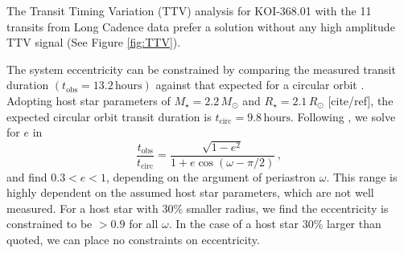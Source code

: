 \documentclass[preprint]{emulateapj}
\begin{document}
The Transit Timing Variation (TTV) analysis for KOI-368.01 with the 
11 transits from Long Cadence data prefer a solution without any high 
amplitude TTV signal (See Figure \ref{fig:TTV}).

The system eccentricity can be constrained by comparing the measured
transit duration $(t_\text{obs}=13.2\,\text{hours})$ against that expected for a circular
orbit \citep[e.g.][]{Barnes2007,Burke2008,Kane2012}. Adopting host star
parameters of $M_\star = 2.2\,M_\odot$ and $R_\star = 2.1\,R_\odot$
[cite/ref], the expected circular orbit transit duration is
$t_\text{circ} =9.8\,\text{hours}$. Following \citet{Burke2008}, we
solve for $e$ in
\begin{equation}
  \label{eq:ecc}
  \frac{t_\text{obs}}{t_\text{circ}} = \frac{\sqrt{1-e^2}}{1+e \cos(\omega-\pi/2)}\,,
\end{equation}
and find $0.3 < e < 1$, depending on the argument of periastron $\omega$. This range is highly
dependent on the assumed host star parameters, which are not well
measured. For a host star with 30\% smaller radius, we find the
eccentricity is constrained to be $>0.9$ for all $\omega$. In the case
of a host star 30\% larger than quoted, we can place no constraints on
eccentricity. 

\begin{figure}
\end{figure}
\end{document}
